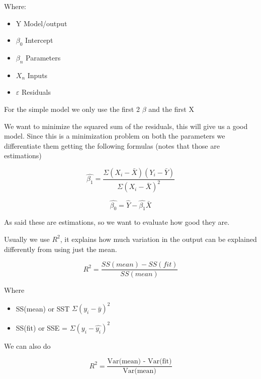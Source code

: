Where:
\begin{itemize}
    \item Y \ra Model/output
    \item $\beta_0$ \ra Intercept
    \item $\beta_n$ \ra Parameters
    \item $X_n$ \ra Inputs
    \item $\varepsilon$ \ra Residuals
\end{itemize}

\vspace{10pt}

For the simple model we only use the first 2 $\beta$ and the first X

We want to minimize the squared sum of the residuals, this will give us a good model. Since this is a minimization problem on both the parameters we differentiate them getting the following formulas (notes that those are estimations)

\begin{equation}
    \hat{\beta_1} = \frac{\Sigma(X_i-\bar{X})(Y_i-\bar{Y})}{\Sigma(X_i-\bar{X})^2}
\end{equation}

\begin{equation}
    \hat{\beta_0} = \hat{Y} - \hat{\beta_1}\bar{X}
\end{equation}

\vspace{10pt}

As said these are estimations, so we want to evaluate how good they are.

Usually we use $R^2$, it explains how much variation in the output can be explained differently from using just the mean.

\begin{equation}
    R^2 = \frac{SS(mean)- SS(fit)}{SS(mean)}
\end{equation}

Where

\begin{itemize}
    \item SS(mean) or SST \ra $\Sigma(y_i-\bar{y})^2$
    \item SS(fit) or SSE = \ra $\Sigma(y_i-\hat{y_i})^2$
\end{itemize}

\vspace{10pt}

We can also do

\begin{equation}
    R^2=\frac{\text{Var(mean) - Var(fit)}}{\text{Var(mean)}}
\end{equation}

